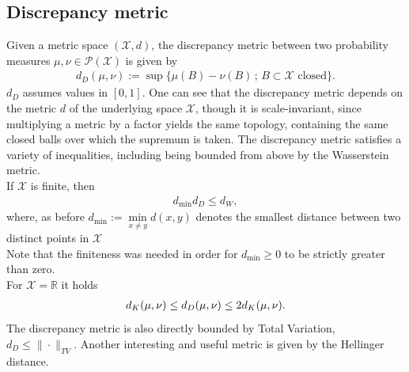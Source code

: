 \documentclass[11pt,a4paper]{article}
\begin{document}
\subsection*{Discrepancy metric}
Given a metric space $(\mathcal{X},d)$, the discrepancy metric between two probability measures $\mu,\nu\in\mathcal{P(X)}$ is given by 
\begin{align*}
d_D(\mu,\nu):=\sup\bigg\lbrace{}\mu(B)-\nu(B)\,;\,B\subset\mathcal{X}\text{ closed}\bigg\rbrace.
\end{align*}
$d_D$ assumes values in $[0,1]$. One can see that the discrepancy metric depends on the metric $d$ of the underlying space $\mathcal{X}$, though it is scale-invariant, since multiplying a metric by a factor yields the same topology, containing the same closed balls over which the supremum is taken.
The discrepancy metric satisfies a variety of inequalities, including being bounded from above by the Wasserstein metric.\vspace{2em}\\
If $\mathcal{X}$ is finite, then
\begin{align*}
d_{\text{min}}d_D \leq d_W,
\end{align*}  
where, as before $d_{\text{min}}:=\min\limits_{x\neq{}y}d(x,y)$ denotes the smallest distance between two distinct points in $\mathcal{X}$\\
Note that the finiteness was needed in order for $d_{\text{min}}\geq{}0$ to be strictly greater than zero. \vspace{2em}\\
For $\mathcal{X}=\mathbb{R}$ it holds 
\begin{align*}
d_K(\mu,\nu)\leq{}d_D(\mu,\nu)\leq{}2d_K(\mu,\nu).
\vspace{2em}\\
\end{align*}
The discrepancy metric is also directly bounded by Total Variation, $d_D\leq\|\cdot\|_{TV}$.\vspace{1em}
Another interesting and useful metric is given by the Hellinger distance.
\end{document}
